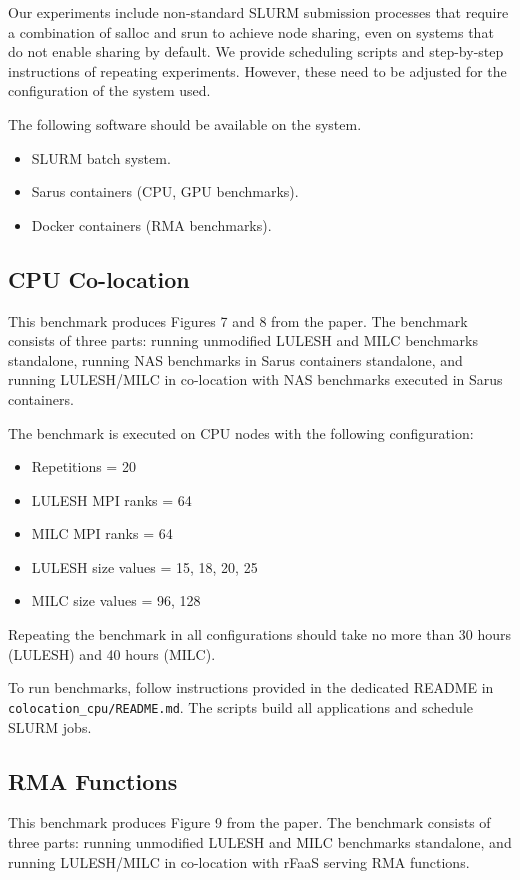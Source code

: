\documentclass{article}
\begin{document}
Our experiments include non-standard SLURM submission processes that require a combination of salloc and srun to achieve node sharing, even on systems that do not enable sharing by default.
We provide scheduling scripts and step-by-step instructions of repeating experiments.
However, these need to be adjusted for the configuration of the system used.

The following software should be available on the system.
\begin{itemize}
  \item SLURM batch system.
  \item Sarus containers (CPU, GPU benchmarks).
  \item Docker containers (RMA benchmarks).
\end{itemize}

\subsection{CPU Co-location}

This benchmark produces Figures 7 and 8 from the paper.
The benchmark consists of three parts: running unmodified LULESH and MILC benchmarks standalone,
running NAS benchmarks in Sarus containers standalone, and running LULESH/MILC in co-location with
NAS benchmarks executed in Sarus containers.

The benchmark is executed on CPU nodes with the following configuration:
\begin{itemize}
  \item Repetitions = 20
  \item LULESH MPI ranks = 64
  \item MILC MPI ranks = 64
  \item LULESH size values = 15, 18, 20, 25
  \item MILC size values = 96, 128
\end{itemize}
Repeating the benchmark in all configurations should take no more than 30 hours (LULESH) and 40 hours (MILC).

To run benchmarks, follow instructions provided in the dedicated README in \texttt{colocation\_cpu/README.md}.
The scripts build all applications and schedule SLURM jobs.

\subsection{RMA Functions}

This benchmark produces Figure 9 from the paper.
The benchmark consists of three parts: running unmodified LULESH and MILC benchmarks standalone,
and running LULESH/MILC in co-location with rFaaS serving RMA functions.
\end{document}
